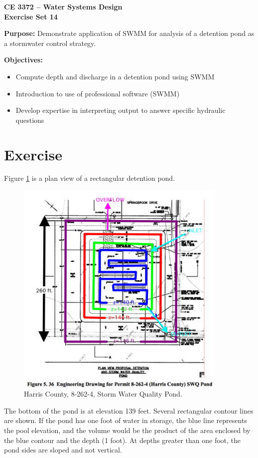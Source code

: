 \documentclass[12pt]{article}
\begin{document}
\begin{center}
{\textbf{{CE 3372 -- Water Systems Design} \\ {Exercise Set 14}}}
\end{center}

\textbf{Purpose:}
Demonstrate application of SWMM for analysis of a detention pond as a stormwater control strategy.

\textbf{Objectives:}
\begin{itemize}
\item Compute depth and discharge in a detention pond using SWMM
\item Introduction to use of professional software (SWMM)
\item Develop expertise in interpreting output to answer specific hydraulic questions
\end{itemize}

\section*{\small{Exercise}}
Figure \ref{fig:detention} is a plan view of a rectangular detention pond.   

\begin{figure}[h!] %
   \centering
   \includegraphics[width=4in]{detention.jpg} 
   \caption{Harris County, 8-262-4, Storm Water Quality Pond.}
   \label{fig:detention}
\end{figure}
\clearpage
The bottom of the pond is at elevation 139 feet.   
Several rectangular contour lines are shown.   
If the pond has one foot of water in storage, the blue line represents the pool elevation, and the volume would be the product of the area enclosed by the blue contour and the depth (1 foot).   
At depths greater than one foot, the pond sides are sloped and not vertical.
\end{document}
